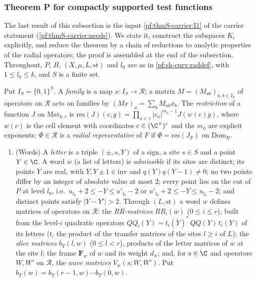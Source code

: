 \subsubsection{Theorem P for compactly supported test functions}

The last result of this subsection is the input \ref{pf:thmS-carrier:I1} of the carrier statement
(\cref{pf:thmS-carrier:needs}). We state it, construct the subspaces $K_i$ explicitly, and reduce the theorem by a chain of
reductions to analytic properties of the radial operators; the proof is assembled at the end of the subsection. Throughout, $P$, $B$,
$(X,\mu,L,\mathrm{st})$ and $l_0$ are as in \cref{pf:sh-curv:raddef}, with $1\le l_0\le k$, and $S$ is a finite set.

\begin{definition}\label{pf:sh-curv:thmPdef}
Put $I_S=\{0,1\}^S$. A \emph{family} is a map $x\colon I_S\to\mathcal R$; a matrix $M=(M_{ab})_{a,b\in I_S}$ of operators on
$\mathcal R$ acts on families by $(Mx)_a=\sum_bM_{ab}x_b$. The \emph{restriction} of a function $J$ on $\mathrm{Mat}_{k,r}$ is
$\mathrm{res}(J)(c,g)=\prod_{a<r}|c_a|^{m_a-1}J(w(c)g)$, where $w(c)$ is the cell element with coordinates
$c\in(\C^\times)^r$ and the $m_a$ are explicit exponents; $\Phi\in\mathcal R$ is a \emph{radial representative} of $F$ if
$\Phi=\mathrm{res}(J_F)$ on $\mathrm{Dom}_R$.
\begin{enumerate}[label=(\alph*)]
\item (Words) A \emph{letter} is a triple $(\pm,s,Y)$ of a sign, a site $s\in S$ and a point $Y\in\C$. A word $w$ (a list of
letters) is \emph{admissible} if its sites are distinct; its points $Y$ are real, with $Y,Y\pm1\in\mathrm{inv}$ and
$q(Y)q(Y-1)\ne0$; no two points differ by an integer of absolute value at most $2$; every point lies on the cut of $P$ at level
$l_0$, i.e.\ $u_{l_0}+2\le-Y\le u'_{l_0}-2$ or $u'_{l_0}+2\le-Y\le u_{l_0}-2$; and distinct points satisfy $|Y-Y'|>2$.
Through $(L,\mathrm{st})$ a word $w$ defines matrices of operators on $\mathcal R$: the \emph{$RR$-matrices} $RR_i(w)$
($0\le i\le r$), built from the level-$i$ quadratic operators $QQ_i(Y)=t_i(\bar Y)^*\,QQ(Y)\,t_i(Y)$ of its letters ($t_i$ the
product of the transfer matrices of the sites $l\ge i$ of $L$); the \emph{slice matrices} $b_T(l,w)$ ($0\le l<r$), products
of the letter matrices of $w$ at the site $l$; the frame $\mathbf F_w$ of $w$ and its weight $d_w$; and, for $s\in\C$ and
operators $W,W'$ on $\mathcal R$, the \emph{wave matrices} $V_w(s;W,W')$. Put $b_T(w)=b_T(r-1,w)\cdots b_T(0,w)$.

\end{enumerate}
\end{definition}
